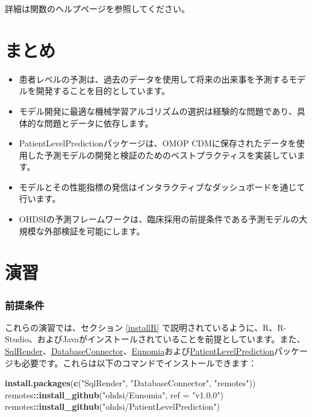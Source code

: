 \documentclass[
  11pt]{book}
\makeatletter
\newenvironment{Shaded}{\begin{snugshade}}{\end{snugshade}}
\newcommand{\AttributeTok}[1]{\textcolor[rgb]{0.13,0.29,0.53}{#1}}
\newcommand{\FunctionTok}[1]{\textcolor[rgb]{0.13,0.29,0.53}{\textbf{#1}}}
\newcommand{\NormalTok}[1]{#1}
\newcommand{\SpecialCharTok}[1]{\textcolor[rgb]{0.81,0.36,0.00}{\textbf{#1}}}
\newcommand{\StringTok}[1]{\textcolor[rgb]{0.31,0.60,0.02}{#1}}
\newenvironment{kframe}{%
\medskip{}
\setlength{\fboxsep}{.8em}
 \def\at@end@of@kframe{}%
 \ifinner\ifhmode%
  \def\at@end@of@kframe{\end{minipage}}%
  \begin{minipage}{\columnwidth}%
 \fi\fi%
 \def\FrameCommand##1{\hskip\@totalleftmargin \hskip-\fboxsep
 \colorbox{myShadeColor}{##1}\hskip-\fboxsep
     \hskip-\linewidth \hskip-\@totalleftmargin \hskip\columnwidth}%
 \MakeFramed {\advance\hsize-\width
   \@totalleftmargin\z@ \linewidth\hsize
   \@setminipage}}%
 {\par\unskip\endMakeFramed%
 \at@end@of@kframe}
\newenvironment{rmdblock}[1]
  {
  \begin{itemize}
  \renewcommand{\labelitemi}{
    \raisebox{-.7\height}[0pt][0pt]{
      {\setkeys{Gin}{width=3em,keepaspectratio}\texttt{[image: images/\#1]}}
    }
  }
  \setlength{\fboxsep}{1em}
  \begin{kframe}
  \item
  }
  {
  \end{kframe}
  \end{itemize}
  }
\newenvironment{rmdsummary}
  {\begin{rmdblock}{summary}}
  {\end{rmdblock}}
\theoremstyle{definition}
\theoremstyle{definition}
\theoremstyle{definition}
\theoremstyle{definition}
\theoremstyle{remark}
\makeatother
\begin{document}
詳細は関数のヘルプページを参照してください。

\section{まとめ}\label{ux307eux3068ux3081-10}

\begin{rmdsummary}
\begin{itemize}
\item
  患者レベルの予測は、過去のデータを使用して将来の出来事を予測するモデルを開発することを目的としています。
\item
  モデル開発に最適な機械学習アルゴリズムの選択は経験的な問題であり、具体的な問題とデータに依存します。
\item
  PatientLevelPredictionパッケージは、OMOP CDMに保存されたデータを使用した予測モデルの開発と検証のためのベストプラクティスを実装しています。
\item
  モデルとその性能指標の発信はインタラクティブなダッシュボードを通じて行います。
\item
  OHDSIの予測フレームワークは、臨床採用の前提条件である予測モデルの大規模な外部検証を可能にします。
\end{itemize}
\end{rmdsummary}

\section{演習}\label{ux6f14ux7fd2-8}

\subsubsection*{前提条件}\label{ux524dux63d0ux6761ux4ef6-8}

これらの演習では、セクション \ref{installR} で説明されているように、R、R-Studio、およびJavaがインストールされていることを前提としています。また、\href{https://ohdsi.github.io/SqlRender/}{SqlRender}、\href{https://ohdsi.github.io/DatabaseConnector/}{DatabaseConnector}、\href{https://ohdsi.github.io/Eunomia/}{Eunomia}および\href{https://ohdsi.github.io/PatientLevelPrediction/}{PatientLevelPrediction}パッケージも必要です。これらは以下のコマンドでインストールできます：

\begin{Shaded}
\begin{Highlighting}[]
\FunctionTok{install.packages}\NormalTok{(}\FunctionTok{c}\NormalTok{(}\StringTok{"SqlRender"}\NormalTok{, }\StringTok{"DatabaseConnector"}\NormalTok{, }\StringTok{"remotes"}\NormalTok{))}
\NormalTok{remotes}\SpecialCharTok{::}\FunctionTok{install\_github}\NormalTok{(}\StringTok{"ohdsi/Eunomia"}\NormalTok{, }\AttributeTok{ref =} \StringTok{"v1.0.0"}\NormalTok{)}
\NormalTok{remotes}\SpecialCharTok{::}\FunctionTok{install\_github}\NormalTok{(}\StringTok{"ohdsi/PatientLevelPrediction"}\NormalTok{)}
\end{Highlighting}
\end{Shaded}
\end{document}
